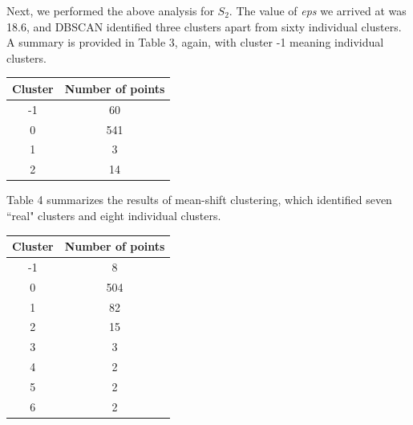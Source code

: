 \documentclass[12pt,a4paper,twocolumn]{article}
\begin{document}
	Next, we performed the above analysis for $S_2$. The value of \textit{eps} we arrived at was 18.6, and DBSCAN identified three clusters apart from sixty individual clusters. A summary is provided in Table 3, again, with cluster -1 meaning individual clusters.\\
	
	\begin{tabular}{|c|c|}
		\hline 
		\textbf{Cluster} & \textbf{Number of points} \\ 
		\hline 
		-1 & 60 \\ 
		\hline 
		0 & 541 \\ 
		\hline 
		1 & 3 \\ 
		\hline 
		2 & 14 \\ 
		\hline 
	\end{tabular} 
	\begingroup
	\endgroup
	\hfill\break
	
	Table 4 summarizes the results of mean-shift clustering, which identified seven ``real" clusters and eight individual clusters.\\
	
	\begin{tabular}{|c|c|}
		\hline 
		\textbf{Cluster} & \textbf{Number of points} \\ 
		\hline 
		-1 & 8 \\ 
		\hline 
		0 & 504 \\ 
		\hline 
		1 & 82 \\ 
		\hline 
		2 & 15 \\ 
		\hline 
		3 & 3 \\ 
		\hline 
		4 & 2 \\ 
		\hline 
		5 & 2 \\ 
		\hline 
		6 & 2 \\ 
		\hline 
	\end{tabular} 
	\begingroup
	\endgroup
	\hfill\break
	
\end{document}
